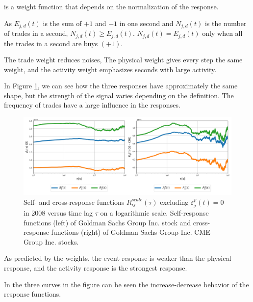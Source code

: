 is a weight function that depends on the normalization of the response.

As $E_{j,d}\left(t\right)$ is the sum of $+1$ and $-1$ in one second and
$N_{j,d}\left(t\right)$ is the number of trades in a second,
$N_{j,d}\left(t\right) \ge E_{j,d}\left(t\right)$.
$N_{j,d}\left(t\right) = E_{j,d}\left(t\right)$ only when all the trades in a
second are buys $(+1)$.

The trade weight reduces noises, The physical weight gives every step the same
weight, and the activity weight emphasizes seconds with large activity.

In Figure \ref{fig:relation_responses}, we can see how the three
responses have approximately the same shape, but the strength of the signal
varies depending on the definition. The frequency of trades have a large
influence in the responses.

\begin{figure}[htbp]
    \centering
    \includegraphics[width=\textwidth]
    {figures/03_response_comparison_2008_GSi_CMEj.png}
    \caption{Self- and cross-response functions
             $R^{scale}_{ij}\left(\tau\right)$ excluding
             $\varepsilon^{p}_{j}\left(t\right) = 0$ in 2008 versus time lag
             $\tau$ on a logarithmic scale. Self-response functions (left) of
             Goldman Sachs Group Inc. stock and cross-response functions
             (right) of Goldman Sachs Group Inc.-CME Group Inc. stocks.}
    \label{fig:relation_responses}
\end{figure}

As predicted by the weights, the event response is weaker than the physical
response, and the activity response is the strongest response.

In the three curves in the figure can be seen the increase-decrease behavior of
the response functions.